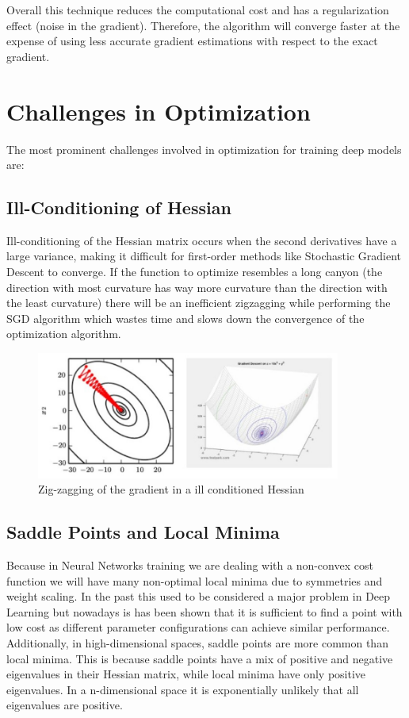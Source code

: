 \noindent Overall this technique reduces the computational cost and has a regularization effect (noise in the gradient). Therefore, the algorithm will converge faster at the expense of using less accurate gradient estimations with respect to the exact gradient.

\newpage

\section{Challenges in Optimization}

The most prominent challenges involved in optimization for training deep models are:

\subsection{Ill-Conditioning of Hessian}

Ill-conditioning of the Hessian matrix occurs when the second derivatives have a large variance, making it difficult for first-order methods like Stochastic Gradient Descent to converge. If the function to optimize resembles a long canyon (the direction with most curvature has way more curvature than the direction with the least curvature) there will be an inefficient zigzagging while performing the SGD algorithm which wastes time and slows down the convergence of the optimization algorithm.

\begin{figure}[h]
    \centering
    \includegraphics[width=10cm]{Plots/ill-conditioned-hessian.jpg}
    \caption{Zig-zagging of the gradient in a ill conditioned Hessian}
\end{figure}

\subsection{Saddle Points and Local Minima}

Because in Neural Networks training we are dealing with a non-convex cost function we will have many non-optimal local minima due to symmetries and weight scaling. In the past this used to be considered a major problem in Deep Learning but nowadays is has been shown that  it is sufficient to find a point with low cost as different parameter configurations can achieve similar performance. Additionally, in high-dimensional spaces, saddle points are more common than local minima. This is because saddle points have a mix of positive and negative eigenvalues in their Hessian matrix, while local minima have only positive eigenvalues. In a n-dimensional space it is exponentially unlikely that all eigenvalues are positive.

